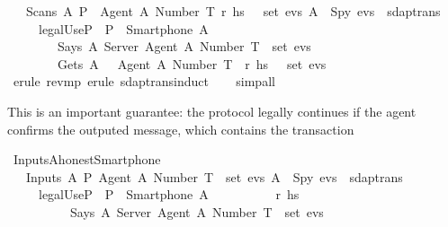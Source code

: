 \begin{isabellebody}
  \ \ {\isachardoublequoteopen}{\isasymlbrakk}\ Scans\ A\ P\ {\isasymlbrace}\ {\isasymlbrace}Agent\ A{\isacharcomma}\ Number\ T{\isasymrbrace}{\isacharcomma}\ r{\isacharprime}{\isacharcomma}\ h\isactrlsub s\ {\isasymrbrace}\ {\isasymin}\ set\ evs{\isacharsemicolon}\ A\ {\isasymnoteq}\ Spy{\isacharsemicolon}\ evs\ {\isasymin}\ sdaptrans\ {\isasymrbrakk}\isanewline
  \ \ \ \ {\isasymLongrightarrow}\ {\isacharparenleft}legalUse{\isacharparenleft}P{\isacharparenright}{\isacharparenright}\ {\isasymand}\ P\ {\isacharequal}\ {\isacharparenleft}Smartphone\ A{\isacharparenright}\ {\isasymand}\isanewline
  \ \ \ \ \ \ \ \ Says\ A\ Server\ {\isasymlbrace}Agent\ A{\isacharcomma}\ Number\ T{\isasymrbrace}\ {\isasymin}\ set\ evs\ {\isasymand}\isanewline
  \ \ \ \ \ \ \ \ Gets\ A\ {\isasymlbrace}\ {\isasymlbrace}\ Agent\ A{\isacharcomma}\ Number\ T\ {\isasymrbrace}{\isacharcomma}\ r{\isacharprime}{\isacharcomma}\ h\isactrlsub s\ {\isasymrbrace}\ {\isasymin}\ set\ evs{\isachardoublequoteclose}\isanewline
  \isadelimproof
  \isanewline
  \ \ %
  \endisadelimproof
  \isatagproof
  \isamarkupfalse%
  \ {\isacharparenleft}erule\ rev{\isacharunderscore}mp{\isacharcomma}\ erule\ sdaptrans{\isachardot}induct{\isacharparenright}\isanewline
  \ \ \isamarkupfalse%
  \ {\isacharparenleft}simp{\isacharunderscore}all{\isacharparenright}\isanewline
  \isamarkupfalse%
  \endisatagproof
  {\isafoldproof}%
  \isadelimproof
  \endisadelimproof
  \begin{isamarkuptext}%
  This is an important guarantee: the protocol legally continues if the agent confirms the outputed message, which contains the transaction%
  \end{isamarkuptext}\isamarkuptrue%
  \isamarkupfalse%
  \ Inputs{\isacharunderscore}A{\isacharunderscore}honest{\isacharunderscore}Smartphone{\isacharunderscore}{}\ {\isacharcolon}\isanewline
  \ \ {\isachardoublequoteopen}{\isasymlbrakk}\ Inputs\ A\ P\ {\isasymlbrace}Agent\ A{\isacharcomma}\ Number\ T{\isasymrbrace}\ {\isasymin}\ set\ evs{\isacharsemicolon}\ A\ {\isasymnoteq}\ Spy{\isacharsemicolon}\ evs\ {\isasymin}\ sdaptrans\ {\isasymrbrakk}\isanewline
  \ \ \ \ {\isasymLongrightarrow}\ {\isacharparenleft}legalUse{\isacharparenleft}P{\isacharparenright}{\isacharparenright}\ {\isasymand}\ P\ {\isacharequal}\ {\isacharparenleft}Smartphone\ A{\isacharparenright}\ {\isasymand}\isanewline
  \ \ \ \ \ \ \ \ {\isacharparenleft}{\isasymexists}\ r{\isacharprime}\ h\isactrlsub s{\isachardot}\isanewline
  \ \ \ \ \ \ \ \ \ \ Says\ A\ Server\ {\isasymlbrace}Agent\ A{\isacharcomma}\ Number\ T{\isasymrbrace}\ {\isasymin}\ set\ evs\ {\isasymand}\isanewline

\end{isabellebody}
